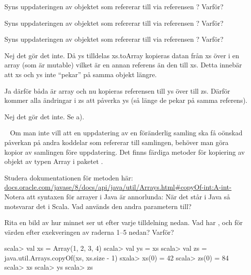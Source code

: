 \Subtask Syns uppdateringen av objektet som  refererar till via referensen ? Varför?

\Subtask Syns uppdateringen av objektet som  refererar till via referensen ? Varför?

\Subtask Syns uppdateringen av objektet som  refererar till via referensen ? Varför?

\SOLUTION


\TaskSolved \what


\SubtaskSolved  Nej det gör det inte.
Då ys tilldelas xs.toArray kopieras datan från xs över i en array (som är mutable) vilket är en annan referens än den till xs.
Detta innebär att xs och ys inte “pekar” på samma objekt längre.

\SubtaskSolved  Ja därför båda är array och nu kopieras referensen till ys över till zs.
Därför kommer alla ändringar i zs att påverka ys (så länge de pekar på samma referens).

\SubtaskSolved  Nej det gör det inte. Se a).



\QUESTEND









\QUESTBEGIN

\Task  \what~  Om man inte vill att en uppdatering av en föränderlig samling ska få oönskad påverkan på andra koddelar som refererar till samlingen, behöver man göra kopior av samlingen före uppdatering. Det finns färdiga metoder för kopiering av objekt av typen Array i paketet .

\Subtask\Pen Studera dokumentationen för metoden  här:\\ \href{https://docs.oracle.com/javase/8/docs/api/java/util/Arrays.html\#copyOf-int:A-int-}{docs.oracle.com/javase/8/docs/api/java/util/Arrays.html\#copyOf-int:A-int-} \\
Notera att syntaxen för arrayer i Java är annorlunda: När det står  i Java så motsvarar det  i Scala. Vad används den andra parametern till?

\Subtask\Pen Rita en bild av hur minnet ser ut efter varje tilldelning nedan. Vad har ,  och  för värden efter exekveringen av raderna 1--5 nedan? Varför?
\begin{REPL}
scala> val xs = Array(1, 2, 3, 4)
scala> val ys = xs
scala> val zs = java.util.Arrays.copyOf(xs, xs.size - 1)
sxala> xs(0) = 42
scala> zs(0) = 84
scala> xs
scala> ys
scala> zs
\end{REPL}

